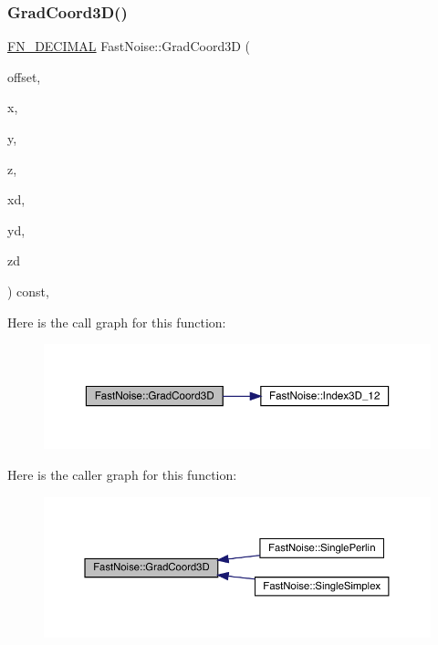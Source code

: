 \subsubsection{\texorpdfstring{Grad\+Coord3\+D()}{GradCoord3D()}}
{\footnotesize\ttfamily \mbox{\hyperlink{_fast_noise_8h_a75a9ef6d2541c4921815b885bfd449c3}{F\+N\+\_\+\+D\+E\+C\+I\+M\+AL}} Fast\+Noise\+::\+Grad\+Coord3D (\begin{DoxyParamCaption}\item[{unsigned char}]{offset,  }\item[{int}]{x,  }\item[{int}]{y,  }\item[{int}]{z,  }\item[{\mbox{\hyperlink{_fast_noise_8h_a75a9ef6d2541c4921815b885bfd449c3}{F\+N\+\_\+\+D\+E\+C\+I\+M\+AL}}}]{xd,  }\item[{\mbox{\hyperlink{_fast_noise_8h_a75a9ef6d2541c4921815b885bfd449c3}{F\+N\+\_\+\+D\+E\+C\+I\+M\+AL}}}]{yd,  }\item[{\mbox{\hyperlink{_fast_noise_8h_a75a9ef6d2541c4921815b885bfd449c3}{F\+N\+\_\+\+D\+E\+C\+I\+M\+AL}}}]{zd }\end{DoxyParamCaption}) const\hspace{0.3cm}{\ttfamily [inline]}, {\ttfamily [private]}}

Here is the call graph for this function\+:
\nopagebreak
\begin{figure}[H]
\begin{center}
\leavevmode
\includegraphics[width=350pt]{d1/dd8/class_fast_noise_a96bc7b4cc9a84cec68c16bf6dfce4f53_cgraph}
\end{center}
\end{figure}
Here is the caller graph for this function\+:
\nopagebreak
\begin{figure}[H]
\begin{center}
\leavevmode
\includegraphics[width=350pt]{d1/dd8/class_fast_noise_a96bc7b4cc9a84cec68c16bf6dfce4f53_icgraph}
\end{center}
\end{figure}
\mbox{\label{class_fast_noise_a96464d203e3868b31bcd9248f32ae259}} 
